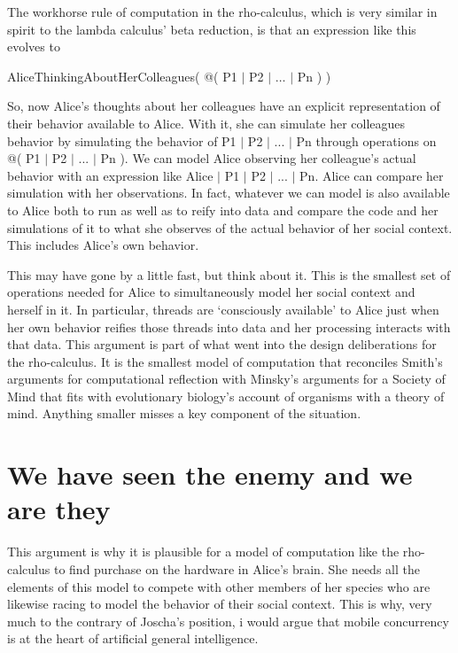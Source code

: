 \documentclass[runningheads]{llncs}
\begin{document}
\vspace{1\baselineskip}
The workhorse rule of computation in the rho-calculus, which is very similar in spirit to the lambda calculus’ beta reduction, is that an expression like this evolves to

\vspace{1\baselineskip}
AliceThinkingAboutHerColleagues( @( P1 $\vert$ P2 $\vert$ $\ldots$ $\vert$ Pn ) )

\vspace{1\baselineskip}
So, now Alice’s thoughts about her colleagues have an explicit representation of their behavior available to Alice. With it, she can simulate her colleagues behavior by simulating the behavior of P1 $\vert$ P2 $\vert$ ... $\vert$ Pn through operations on @( P1 $\vert$ P2 $\vert$ ... $\vert$ Pn ). We can model Alice observing her colleague’s actual behavior with an expression like Alice $\vert$ P1 $\vert$ P2 $\vert$ ... $\vert$ Pn. Alice can compare her simulation with her observations. In fact, whatever we can model is also available to Alice both to run as well as to reify into data and compare the code and her simulations of it to what she observes of the actual behavior of her social context. This includes Alice’s own behavior. 

\vspace{1\baselineskip}
This may have gone by a little fast, but think about it. This is the smallest set of operations needed for Alice to simultaneously model her social context and herself in it. In particular, threads are ‘consciously available’ to Alice just when her own behavior reifies those threads into data and her processing interacts with that data. This argument is part of what went into the design deliberations for the rho-calculus. It is the smallest model of computation that reconciles Smith’s arguments for computational reflection with Minsky’s arguments for a Society of Mind that fits with evolutionary biology’s account of organisms with a theory of mind. Anything smaller misses a key component of the situation.

\vspace{1\baselineskip}
\section{We have seen the enemy and we are they}

This argument is why it is plausible for a model of computation like the rho-calculus to find purchase on the hardware in Alice’s brain. She needs all the elements of this model to compete with other members of her species who are likewise racing to model the behavior of their social context. This is why, very much to the contrary of Joscha’s position, i would argue that mobile concurrency is at the heart of artificial general intelligence.
\end{document}
